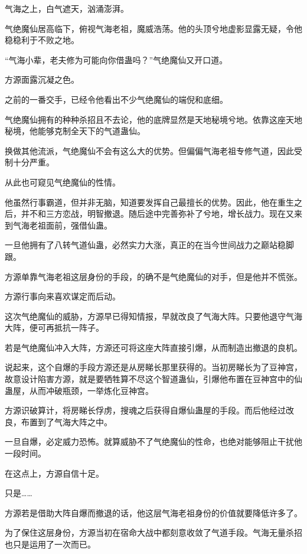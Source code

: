 
\begin{this_body}

气海之上，白气遮天，汹涌澎湃。

气绝魔仙居高临下，俯视气海老祖，魔威浩荡。他的头顶兮地虚影显露无疑，令他稳稳利于不败之地。

“气海小辈，老夫修为可能向你借蛊吗？”气绝魔仙又开口道。

方源面露沉凝之色。

之前的一番交手，已经令他看出不少气绝魔仙的端倪和底细。

气绝魔仙拥有的种种杀招且不去论，他的底牌显然是天地秘境兮地。依靠这座天地秘境，他能够克制全天下的气道蛊仙。

换做其他流派，气绝魔仙不会有这么大的优势。但偏偏气海老祖专修气道，因此受制十分严重。

从此也可窥见气绝魔仙的性情。

他虽然行事霸道，但并非无脑，知道要发挥自己最擅长的优势。因此，他在重生之后，并不和三方恋战，明智撤退。随后途中完善弥补了兮地，增长战力。现在又来到气海老祖面前，强借仙蛊。

一旦他拥有了八转气道仙蛊，必然实力大涨，真正的在当今世间战力之巅站稳脚跟。

方源单靠气海老祖这层身份的手段，的确不是气绝魔仙的对手，但是他并不慌张。

方源行事向来喜欢谋定而后动。

这次气绝魔仙的威胁，方源早已得知情报，早就改良了气海大阵。只要他退守气海大阵，便可再抵抗一阵子。

若是气绝魔仙冲入大阵，方源还可将这座大阵直接引爆，从而制造出撤退的良机。

说起来，这个自爆的手段方源还是从房睇长那里获得的。当初房睇长为了豆神宫，故意设计陷害方源，就是要牺牲算不尽这个智道蛊仙，引爆他布置在豆神宫中的仙蛊屋，从而冲破瓶颈，一举炼化豆神宫。

方源识破算计，将房睇长俘虏，搜魂之后获得自爆仙蛊屋的手段。而后他经过改良，布置到了气海大阵之中。

一旦自爆，必定威力恐怖。就算威胁不了气绝魔仙的性命，也绝对能够阻止干扰他一段时间。

在这点上，方源自信十足。

只是……

方源若是借助大阵自爆而撤退的话，他这层气海老祖身份的价值就要降低许多了。

为了保住这层身份，方源当初在宿命大战中都刻意收敛了气道手段。气海无量杀招也只是运用了一次而已。


\end{this_body}
